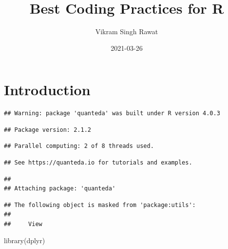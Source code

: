 \documentclass[
]{book}
\title{Best Coding Practices for R}
\author{Vikram Singh Rawat}
\date{2021-03-26}
\newenvironment{Shaded}{\begin{snugshade}}{\end{snugshade}}
\newcommand{\AttributeTok}[1]{\textcolor[rgb]{0.77,0.63,0.00}{#1}}
\newcommand{\ConstantTok}[1]{\textcolor[rgb]{0.00,0.00,0.00}{#1}}
\newcommand{\FunctionTok}[1]{\textcolor[rgb]{0.00,0.00,0.00}{#1}}
\newcommand{\NormalTok}[1]{#1}
\newcommand{\SpecialCharTok}[1]{\textcolor[rgb]{0.00,0.00,0.00}{#1}}
\begin{document}
\maketitle

{
\setcounter{tocdepth}{1}
\tableofcontents
}
\hypertarget{part-introduction}{%
\part{Introduction}\label{part-introduction}}

\begin{Shaded}
\end{Shaded}

\begin{verbatim}
## Warning: package 'quanteda' was built under R version 4.0.3
\end{verbatim}

\begin{verbatim}
## Package version: 2.1.2
\end{verbatim}

\begin{verbatim}
## Parallel computing: 2 of 8 threads used.
\end{verbatim}

\begin{verbatim}
## See https://quanteda.io for tutorials and examples.
\end{verbatim}

\begin{verbatim}
## 
## Attaching package: 'quanteda'
\end{verbatim}

\begin{verbatim}
## The following object is masked from 'package:utils':
## 
##     View
\end{verbatim}

\begin{Shaded}
\begin{Highlighting}[]
\FunctionTok{library}\NormalTok{(dplyr)}
\end{Highlighting}
\end{Shaded}
\end{document}
